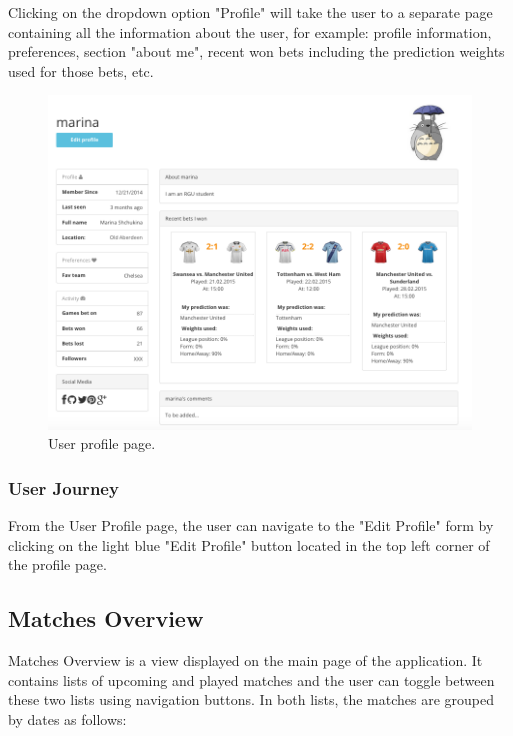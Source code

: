 Clicking on the dropdown option "Profile" will take the user to a separate page containing all the information about the user, for example: profile information, preferences, section "about me", recent won bets including the prediction weights used for those bets, etc.

\begin{figure}[H]
	\begin{center}
		\includegraphics[width=.90\textwidth]{impl/images/profile}
		\caption{User profile page.}
		\label{fig:profile}
	\end{center}
\end{figure}

\subsubsection*{User Journey}
\label{subsec:authandprofileuserjourney}
From the User Profile page, the user can navigate to the "Edit Profile" form by clicking on the light blue "Edit Profile" button located in the top left corner of the profile page.

\subsection{Matches Overview}
Matches Overview is a view displayed on the main page of the application. It contains lists of upcoming and played matches and the user can toggle between these two lists using navigation buttons. In both lists, the matches are grouped by dates as follows:

